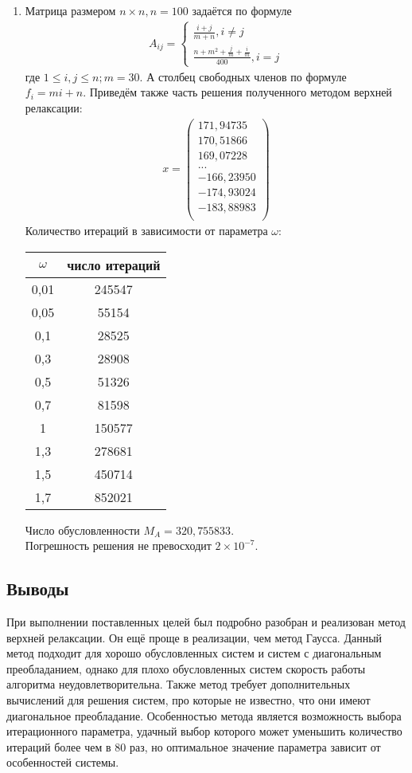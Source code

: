 \documentclass[a4paper,12pt,titlepage,finall]{article}
\begin{document}
\begin{enumerate}
\item
Матрица размером $n \times n, n = 100$ задаётся по формуле
\begin{align}
A_{ij} = \left\{
\begin{array}{ll}
\frac{i+j}{m+n}, i \neq j\\
\frac{n + m^2 + \frac{j}{m} + \frac{i}{m}}{400}, i = j
\end{array}
\right.
\end{align}
где $1 \leq i,j \leq n; m = 30$. А столбец свободных членов по формуле $f_i = mi + n$. Приведём также часть решения полученного методом верхней релаксации:
\begin{align*}
x = \begin{pmatrix}
171,94735 \\
 170,51866 \\
 169,07228 \\
   ...\\
 -166,23950 \\
-174,93024 \\
-183,88983 \\  
\end{pmatrix}
\end{align*}
Количество итераций в зависимости от параметра $\omega$:
\begin{center}
\begin{tabular}{|c|c|}
\hline
$\omega$ & число итераций\\
\hline
0,01 & 245547\\
0,05 & 55154\\
0,1 & 28525\\
0,3 & 28908\\
0,5 & 51326\\
0,7 & 81598\\
 1 & 150577\\
 1,3 & 278681\\
 1,5 & 450714\\
 1,7 & 852021\\
 \hline
\end{tabular}
\end{center}

Число обусловленности $M_A = 320,755833$.\\
Погрешность решения не превосходит $2 \times 10^{-7}$.
\end{enumerate}

\subsection{Выводы}
При выполнении поставленных целей был подробно разобран и реализован метод верхней релаксации. Он ещё проще в реализации, чем метод Гаусса. Данный метод подходит для хорошо обусловленных систем и систем с диагональным преобладанием, однако для плохо обусловленных систем скорость работы алгоритма неудовлетворительна. Также метод требует дополнительных вычислений для решения систем, про которые не известно, что они имеют диагональное преобладание. Особенностью метода является возможность выбора итерационного параметра, удачный выбор которого может уменьшить количество итераций более чем в $80$ раз, но оптимальное значение параметра зависит от особенностей системы.
\end{document}
